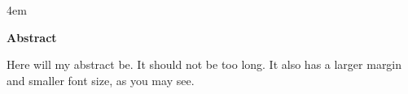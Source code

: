 \begingroup
\leftskip4em
\rightskip\leftskip
\begin{center}
  \large \bf Abstract 
\end{center}\vspace{-1.5\parskip}
\small
Here will my abstract be. It should not be too long. It also has a larger
margin and smaller font size, as you may see.
\par
\endgroup
